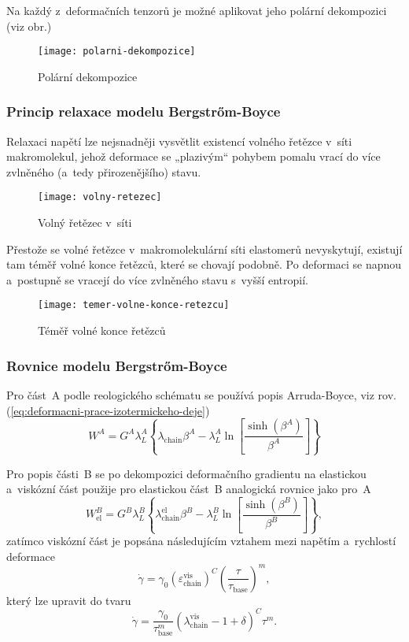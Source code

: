 Na každý z~deformačních tenzorů je možné aplikovat jeho polární dekompozici (viz obr.)
\begin{figure}[H]
	\centering
	\texttt{[image: polarni-dekompozice]}
	\caption{Polární dekompozice}
	\label{fig:polarni-dekompozice}
\end{figure}

\subsubsection{Princip relaxace modelu Bergstrőm-Boyce}
Relaxaci napětí lze nejsnadněji vysvětlit existencí volného řetězce v~síti makromolekul, jehož deformace se „plazivým“ pohybem pomalu vrací do více zvlněného (a~tedy přirozenějšího) stavu.
\begin{figure}[H]
	\centering
	\texttt{[image: volny-retezec]}
	\caption{Volný řetězec v~síti}
	\label{fig:volny-retezec}
\end{figure}

Přestože se volné řetězce v~makromolekulární síti elastomerů nevyskytují, existují tam téměř volné konce řetězců, které se chovají podobně.
Po deformaci se napnou a~postupně se vracejí do více zvlněného stavu s~vyšší entropií.
\begin{figure}[H]
	\centering
	\texttt{[image: temer-volne-konce-retezcu]}
	\caption{Téměř volné konce řetězců}
	\label{fig:temer-volne-konce-retezcu}
\end{figure}

\subsubsection{Rovnice modelu Bergstrőm-Boyce}
Pro část~A podle reologického schématu se používá popis Arruda-Boyce, viz rov. (\ref{eq:deformacni-prace-izotermickeho-deje})
\begin{equation}
	W^A = G^A \lambda_L^A \left\{ \lambda_\text{chain} \beta^A - \lambda_L^A \ln\left[ \frac{\sinh\left(\beta^A\right)}{\beta^A} \right] \right\}
\end{equation}

Pro popis části~B se po dekompozici deformačního gradientu na elastickou a~viskózní část použije pro elastickou část~B analogická rovnice jako pro~A
\begin{equation}
	W_\text{el}^B = G^B \lambda_L^B \left\{ \lambda_\text{chain}^\text{el} \beta^B - \lambda_L^B \ln\left[ \frac{\sinh\left(\beta^B\right)}{\beta^B} \right] \right\},
\end{equation}
zatímco viskózní část je popsána následujícím vztahem mezi napětím a~rychlostí deformace
\begin{equation}
	\dot{\gamma} = \gamma_0 \left( \varepsilon_\text{chain}^\text{vis} \right)^C \left( \frac{\tau}{\tau_\text{base}} \right)^m,
\end{equation}
který lze upravit do tvaru
\begin{equation}
	\dot{\gamma} = \frac{\gamma_0}{\tau_\text{base}^m} \left( \lambda_\text{chain}^\text{vis} - 1 + \delta \right)^C \tau^m.
\end{equation}

